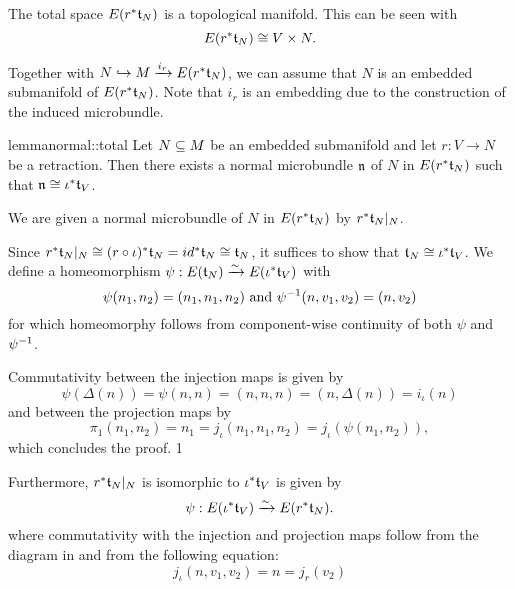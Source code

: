 \begin{myparagraph}
    The total space $E(r^*\mathfrak{t}_N)$ is a topological manifold.
    This can be seen with
    \[ E(r^*\mathfrak{t}_N) \cong V \times N. \]

    Together with $N \hookrightarrow{} M \xrightarrow{i_r} E(r^*\mathfrak{t}_N)$, we can assume that
    $N$ is an embedded submanifold of $E(r^*\mathfrak{t}_N)$.
    Note that $i_r$ is an embedding due to the construction of the induced microbundle.
\end{myparagraph}

\begin{mystatement}{lemma}{normal::total}
    Let $N \subseteq{} M$ be an embedded submanifold and let $r: V \to N$ be a retraction.
    Then there exists a normal microbundle $\mathfrak{n}$ of $N$ in $E(r^*\mathfrak{t}_N)$ such that $\mathfrak{n} \cong \iota^*\mathfrak{t}_V$.
\end{mystatement}

\begin{myproof}
    We are given a normal microbundle of $N$ in $E(r^*\mathfrak{t}_N)$ by $r^*\mathfrak{t}_N\vert_{N}$.
    
    Since $r^*\mathfrak{t}_N\vert_{N} \cong (r \circ \iota)^*\mathfrak{t}_N = id^*\mathfrak{t}_N \cong \mathfrak{t}_N$,
    it suffices to show that $\mathfrak{t}_N \cong \iota^*\mathfrak{t}_V$.
    We define a homeomorphism $\psi: E(\mathfrak{t}_N) \xrightarrow{\sim} E(\iota^*\mathfrak{t}_V)$ with
    \[ \psi(n_1, n_2) = (n_1, n_1, n_2) \text{ and } \psi^{-1}(n, v_1, v_2) = (n, v_2) \]
    for which homeomorphy follows from component-wise
    continuity of both $\psi$ and $\psi^{-1}$.
    
    Commutativity between the injection maps is given by
    \[ \psi(\Delta(n)) = \psi(n, n) = (n, n, n) = (n, \Delta(n)) = i_\iota(n) \]
    and between the projection maps by
    \[ \pi_1(n_1, n_2) = n_1 = j_\iota(n_1, n_1, n_2) = j_\iota(\psi(n_1, n_2)), \]
    which concludes the proof.
    1
    
    Furthermore, $r^*\mathfrak{t}_N\vert_{N}$ is isomorphic to $\iota^*\mathfrak{t}_V$ is given by
    \[ \psi: E(\iota^*\mathfrak{t}_V) \xrightarrow{\sim} E(r^*\mathfrak{t}_N). \]
    where commutativity with the injection and projection maps
    follow from the diagram in  and from the following equation:
    \[ j_\iota(n, v_1, v_2) = n = j_r(v_2) \]
\end{myproof}